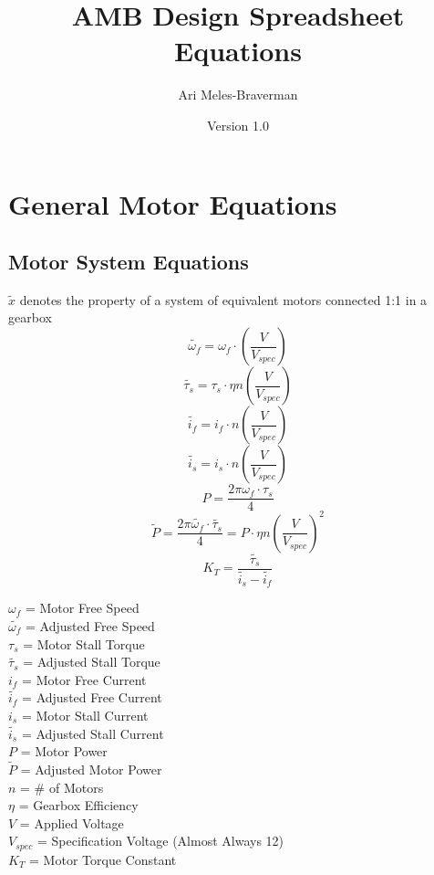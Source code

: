 \documentclass[11pt,a4paper,titlepage]{article}
\begin{document}
	\title{AMB Design Spreadsheet Equations}
	\author{Ari Meles-Braverman}
	\date{Version 1.0}
	\maketitle
	
	\section{General Motor Equations}
	\subsection{Motor System Equations}
	$\tilde{x}$ denotes the property of a system of equivalent motors connected 1:1 in a gearbox
	\begin{equation}
		\tilde{\omega_f} = \omega_f \cdot \left( \frac{V}{V_{spec}} \right)
	\end{equation}
	\begin{equation}
		\tilde{\tau_s} = \tau_s \cdot \eta n \left( \frac{V}{V_{spec}} \right)
	\end{equation}
	\begin{equation}
		\tilde{i_f} = i_f \cdot n \left( \frac{V}{V_{spec}} \right)
	\end{equation}
	\begin{equation}
		\tilde{i_s} = i_s \cdot n \left( \frac{V}{V_{spec}} \right)
	\end{equation}
	\begin{equation}
		P = \frac{2\pi \omega_f \cdot \tau_s}{4}
	\end{equation}
	\begin{equation}
		\tilde{P} = \frac{2\pi \tilde{\omega_f} \cdot \tilde{\tau_s}}{4} = P \cdot \eta n \left( \frac{V}{V_{spec}} \right) ^2
	\end{equation}
	\begin{equation}
		K_T = \frac{\tilde{\tau_s}}{\tilde{i_s} - \tilde{i_f}}
	\end{equation}
	
	$\omega_f$ = Motor Free Speed \\
	$\tilde{\omega_f}$ = Adjusted Free Speed \\
	$\tau_s$ = Motor Stall Torque \\
	$\tilde{\tau_s}$ = Adjusted Stall Torque \\
	$i_f$ = Motor Free Current \\
	$\tilde{i_f}$ = Adjusted Free Current \\
	$i_s$ = Motor Stall Current \\
	$\tilde{i_s}$ = Adjusted Stall Current \\
	$P$ = Motor Power \\
	$\tilde{P}$ = Adjusted Motor Power \\
	$n$ = \# of Motors \\
	$\eta$ = Gearbox Efficiency \\
	$V$ = Applied Voltage \\
	$V_{spec}$ = Specification Voltage (Almost Always 12) \\
	$K_T$ = Motor Torque Constant
	
\end{document}
